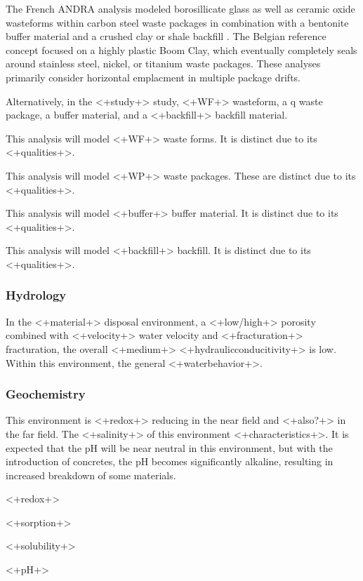{The French \gls{ANDRA} analysis modeled borosillicate glass as well as ceramic 
oxide wasteforms within carbon steel waste packages in combination with a bentonite 
buffer material and a crushed clay or shale backfill \cite{andra_argile:_2005}.
The Belgian reference concept focused on a highly plastic Boom Clay, which 
eventually completely seals around stainless steel, nickel, or titanium waste 
packages. These analyses primarily consider horizontal emplacment in multiple 
package drifts. 


Alternatively, in the <+study+> study, <+WF+> wasteform, a q waste package, a 
buffer material, and a <+backfill+> backfill material.

This analysis will model <+WF+> waste forms. It is distinct due to its 
<+qualities+>.

This analysis will model <+WP+> waste packages. These are distinct due to its 
<+qualities+>.

This analysis will model <+buffer+> buffer material. It is distinct due to its 
<+qualities+>.

This analysis will model <+backfill+> backfill. It is distinct due to its 
<+qualities+>.


\subsubsection{Hydrology}

In the <+material+> disposal environment, a <+low/high+> porosity combined with 
<+velocity+> water velocity and <+fracturation+> fracturation, the overall 
<+medium+> <+hydraulicconducitivity+> is low. Within this environment, the  
general <+waterbehavior+>.


\subsubsection{Geochemistry}

This environment is <+redox+> reducing in the near field and <+also?+> in the 
far field. The <+salinity+> of this environment <+characteristics+>. It is 
expected that the pH will be near neutral in this environment, but with the 
introduction of concretes, the pH becomes significantly alkaline, resulting in 
increased breakdown of some materials. 

<+redox+>

<+sorption+>

<+solubility+>

<+pH+>

}
